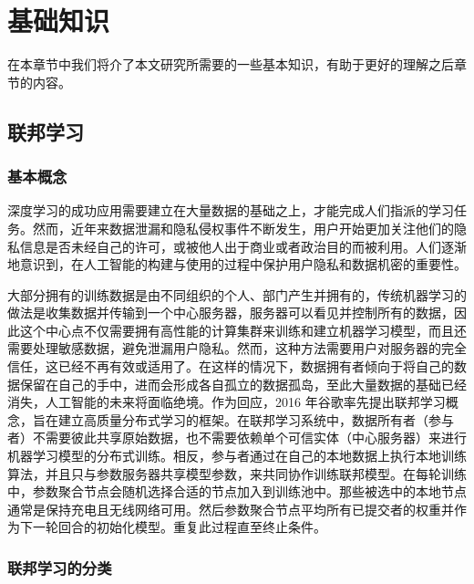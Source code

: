 \chapter{基础知识}
\label{ch2}
在本章节中我们将介了本文研究所需要的一些基本知识，有助于更好的理解之后章节的内容。

\section{联邦学习}

\subsection{基本概念}
深度学习的成功应用需要建立在大量数据的基础之上，才能完成人们指派的学习任务。然而，近年来数据泄漏和隐私侵权事件不断发生，用户开始更加关注他们的隐私信息是否未经自己的许可，或被他人出于商业或者政治目的而被利用。人们逐渐地意识到，在人工智能的构建与使用的过程中保护用户隐私和数据机密的重要性。

大部分拥有的训练数据是由不同组织的个人、部门产生并拥有的，传统机器学习的做法是收集数据并传输到一个中心服务器，服务器可以看见并控制所有的数据，因此这个中心点不仅需要拥有高性能的计算集群来训练和建立机器学习模型，而且还需要处理敏感数据，避免泄漏用户隐私。然而，这种方法需要用户对服务器的完全信任，这已经不再有效或适用了。在这样的情况下，数据拥有者倾向于将自己的数据保留在自己的手中，进而会形成各自孤立的数据孤岛，至此大量数据的基础已经消失，人工智能的未来将面临绝境。作为回应，2016 年谷歌率先提出联邦学习概念，旨在建立高质量分布式学习的框架。在联邦学习系统中，数据所有者（参与者）不需要彼此共享原始数据，也不需要依赖单个可信实体（中心服务器）来进行机器学习模型的分布式训练。相反，参与者通过在自己的本地数据上执行本地训练算法，并且只与参数服务器共享模型参数，来共同协作训练联邦模型。在每轮训练中，参数聚合节点会随机选择合适的节点加入到训练池中。那些被选中的本地节点通常是保持充电且无线网络可用。然后参数聚合节点平均所有已提交者的权重并作为下一轮回合的初始化模型。重复此过程直至终止条件。

\subsection{联邦学习的分类}

